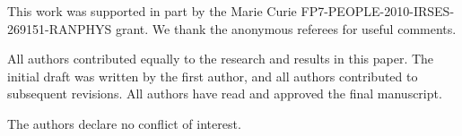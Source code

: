 \documentclass[information,article,accept,moreauthors,pdftex,12pt,a4paper]{mdpi}
\theoremstyle{mdpi}
\newcounter{re}
\theoremstyle{mdpidefinition}
\begin{document}
\newpage
{}

This work was supported in part by the
Marie Curie FP7-PEOPLE-2010-IRSES-269151-RANPHYS grant.
We thank the anonymous referees for useful comments.


All authors contributed equally to the research and results in this paper.
The initial draft was written by %
the first author, and all authors contributed to subsequent revisions.
All authors have read and approved the final manuscript.



The authors declare no conflict of interest.


%
%
\end{document}

